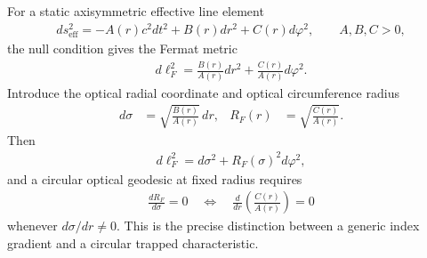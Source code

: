         For a static axisymmetric effective line element
        \begin{align}
            ds_{\mathrm{eff}}^2
            =
            -A(r)c^2dt^2+B(r)dr^2+C(r)d\varphi^2,
            \qquad A,B,C>0,
            \label{eq:rt_fermat_static_metric}
        \end{align}
        the null condition gives the Fermat metric
        \begin{align}
            \boxed{
            d\ell_F^2
            =
            \frac{B(r)}{A(r)}dr^2
            +
            \frac{C(r)}{A(r)}d\varphi^2.
            }
            \label{eq:rt_fermat_metric_general}
        \end{align}
        Introduce the optical radial coordinate and optical circumference radius
        \begin{align}
            d\sigma
            &=
            \sqrt{\frac{B(r)}{A(r)}}\,dr,
            &
            R_F(r)
            &=
            \sqrt{\frac{C(r)}{A(r)}}.
            \label{eq:rt_fermat_radial_circumference}
        \end{align}
        Then
        \begin{align}
            d\ell_F^2=d\sigma^2+R_F(\sigma)^2d\varphi^2,
        \end{align}
        and a circular optical geodesic at fixed radius requires
        \begin{align}
            \boxed{
            \frac{dR_F}{d\sigma}=0
            }
            \quad\Longleftrightarrow\quad
            \boxed{
            \frac{d}{dr}
            \left(
                \frac{C(r)}{A(r)}
            \right)=0
            }
            \label{eq:rt_fermat_light_ring_gate}
        \end{align}
        whenever \(d\sigma/dr\neq0\).  This is the precise distinction between a
        generic index gradient and a circular trapped characteristic.

